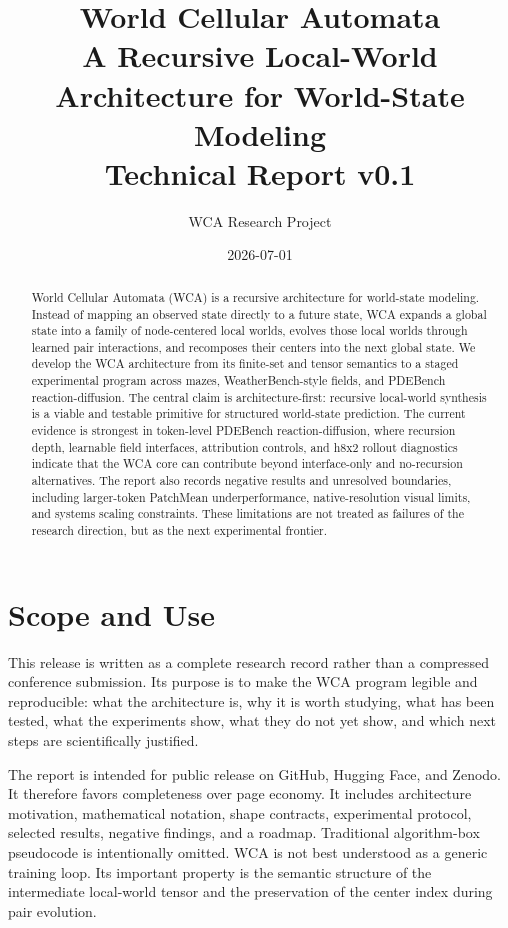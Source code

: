 \documentclass[11pt]{article}
\title{\textbf{World Cellular Automata}\\
\large A Recursive Local-World Architecture for World-State Modeling\\
\normalsize Technical Report v0.1}
\author{WCA Research Project}
\date{2026-07-01}
\begin{document}
\maketitle

\begin{abstract}
World Cellular Automata (WCA) is a recursive architecture for world-state
modeling. Instead of mapping an observed state directly to a future state, WCA
expands a global state into a family of node-centered local worlds, evolves
those local worlds through learned pair interactions, and recomposes their
centers into the next global state. We develop the WCA architecture from its
finite-set and tensor semantics to a staged experimental program across mazes,
WeatherBench-style fields, and PDEBench reaction-diffusion. The central claim is architecture-first: recursive
local-world synthesis is a viable and testable primitive for structured
world-state prediction. The current evidence is strongest in token-level
PDEBench reaction-diffusion, where recursion depth, learnable field interfaces,
attribution controls, and h8x2 rollout diagnostics indicate that the WCA core
can contribute beyond interface-only and no-recursion alternatives. The report
also records negative results and unresolved boundaries, including larger-token
PatchMean underperformance, native-resolution visual limits, and systems
scaling constraints. These limitations are not treated as failures of the
research direction, but as the next experimental frontier.
\end{abstract}

\tableofcontents
\newpage

\section{Scope and Use}

This release is written as a complete research record rather than a compressed
conference submission. Its purpose is to make the WCA program legible and
reproducible: what the architecture is, why it is worth studying, what has
been tested, what the experiments show, what they do not yet show, and which
next steps are scientifically justified.

The report is intended for public release on GitHub, Hugging Face, and Zenodo.
It therefore favors completeness over page economy. It includes architecture
motivation, mathematical notation, shape contracts, experimental protocol,
selected results, negative findings, and a roadmap. Traditional algorithm-box
pseudocode is intentionally omitted. WCA is not best understood as a generic
training loop. Its important property is the semantic structure of the
intermediate local-world tensor and the preservation of the center index during
pair evolution.
\end{document}
